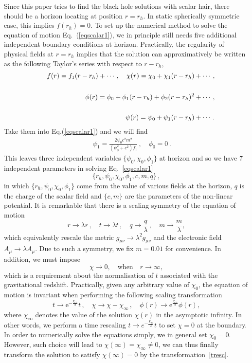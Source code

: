\documentclass[pr, twocolumn, preprintnumbers, showpacs,footnoteadded, superscriptaddress,nofootinbib,longbibliography]{revtex4-1}
\newcommand{\te}{\mathrm{e}}
\begin{document}
Since this paper tries to find the black hole solutions with scalar hair, there should be a horizon locating at position $r=r_h$. In static spherically symmetric case, this implies $f(r_h)=0$. To set up the numerical method to solve the equation of motion Eq.~(\ref{eqscalar1}), we in principle still needs five additional independent boundary conditions at horizon. Practically, the regularity of physical fields at $r=r_h$ implies that the solution can approximatively be written as the following Taylor's series with respect to $r-r_h$,
%
\begin{eqnarray} \label{horbou1}
&&f(r)=f_1 (r-r_h)+\cdots, \quad \chi(r)=\chi_0+\chi_1(r-r_h)+\cdots \, ,\cr
~\cr
&&\phi(r)=\phi_0+\phi_1(r-r_h)+\phi_2 (r-r_h)^2+\cdots\, , \cr
~\cr
&&\psi(r)=\psi_0+\psi_1(r-r_h)+\cdots \, .
\end{eqnarray}
%
Take them into Eq.(\ref{eqscalar1}) and we will find
%
\begin{eqnarray} \label{horbou2}
&&\psi_1=\frac{2\psi_0 c^2 m^2}{(\psi_0^2+c^2)f_1}\, ,\quad \phi_0=0\,.
\end{eqnarray}
%
This leaves three independent variables $\{\psi_0, \chi_0, \phi_1\}$ at horizon and so we have 7 independent parameters in solving Eq.~\eqref{eqscalar1}
%
\begin{equation}
\{r_h, \psi_0, \chi_0, \phi_1, c, m, q \} \, ,
\end{equation}
%
in which $\{r_h, \psi_0, \chi_0, \phi_1 \}$ come from the value of various fields at the horizon, $q$ is the charge of the scalar field and $\{c, m\}$ are the parameters of the non-linear potential. It is remarkable that there is a scaling symmetry of the equation of motion
%
\begin{equation}
r \to \lambda r \, , \quad t \to \lambda t \, , \quad  q \to \frac{q}{\lambda} \, , \quad m \to \frac{m}{\lambda},
\end{equation}
%
which equivalently rescale the metric $g_{\mu\nu} \to \lambda ^2 g_{\mu\nu}$ and the electronic field $A_\mu \to \lambda A_\mu$. Due to such a symmetry, we fix $m=0.01$ for convenience. In addition, we must impose
%
\begin{equation}
\chi \to 0, \quad \text{when} \quad r \to \infty,
\end{equation}
%
which is a requirement about the normalisation of $t$ associated with the gravitational redshift\cite{Hartnoll:2008kx}. Practically, given any arbitrary value of $\chi_0$, the equation of motion is invariant when performing the following scaling transformation
%
\begin{equation} \label{tresc}
t \to \te^{-\frac{\chi_{\infty}}{2}}t \, , \quad \chi  \to \chi - \chi_{\infty} \, , \quad \phi(r) \to  \te^{\frac{\chi_{\infty}}{2}}\phi(r),
\end{equation}
%
where $\chi_{\infty}$ denotes the value of the solution $\chi(r)$ in the asymptotic infinity. In other words, we perform a time rescaling $t \to e^{-\frac{\chi_{\infty}}{2}}t$ to set $\chi=0$ at the boundary. In order to numerically solve the equations simply, we in general set $\chi_0=0$. However, such choice will lead to $\chi(\infty)=\chi_\infty\neq0$, we can thus finally transform the solution to satisfy $\chi(\infty)=0$ by the transformation~\eqref{tresc}.
\end{document}

